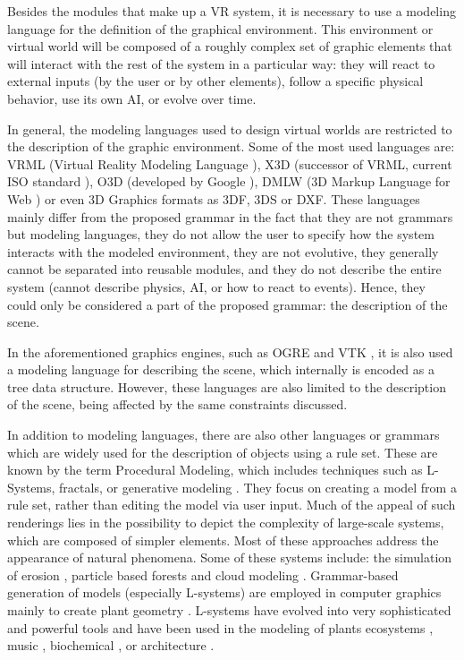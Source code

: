 Besides the modules that make up a VR system, it is necessary to use a modeling language for the
definition of the graphical environment. This environment or virtual world will be composed of a
roughly complex set of graphic elements that will interact with the rest of the system in a
particular way: they will react to external inputs (by the user or by other elements), follow a
specific physical behavior, use its own AI, or evolve over time.

In general, the modeling languages used to design virtual worlds \cite{Bartle2004} are restricted
to the description of the graphic environment. Some of the most used languages are: VRML (Virtual
Reality Modeling Language \cite{Web3D}), X3D (successor of VRML, current ISO standard
\cite{Web3D}), O3D (developed by Google \cite{O3D}), DMLW (3D Markup Language for Web \cite{DMLW})
or even 3D Graphics formats as 3DF, 3DS or DXF. These languages mainly differ from the proposed
grammar in the fact that they are not grammars but modeling languages, they do not allow the user
to specify how the system interacts with the modeled environment, they are not evolutive, they
generally cannot be separated into reusable modules, and they do not describe the entire system
(cannot describe physics, AI, or how to react to events). Hence, they could only be considered a
part of the proposed grammar: the description of the scene.

In the aforementioned graphics engines, such as OGRE \cite{OGRE} and VTK \cite{VTK}, it is also
used a modeling language for describing the scene, which internally is encoded as a tree data
structure. However, these languages are also limited to the description of the scene, being
affected by the same constraints discussed.

In addition to modeling languages, there are also other languages or grammars which are widely used
for the description of objects using a rule set. These are known by the term Procedural Modeling,
which includes techniques such as L-Systems, fractals, or generative modeling \cite{Yoav2001}. They
focus on creating a model from a rule set, rather than editing the model via user input. Much of
the appeal of such renderings lies in the possibility to depict the complexity of large-scale
systems, which are composed of simpler elements. Most of these approaches address the appearance of
natural phenomena. Some of these systems include: the simulation of erosion \cite{Musgrave1990},
particle based forests \cite{Reeves1985} and cloud modeling \cite{Perlin1985}. Grammar-based
generation of models (especially L-systems) are employed in computer graphics mainly to create
plant geometry \cite{Lindenmayer1990,Lindenmayer1992}. L-systems have evolved into very
sophisticated and powerful tools \cite{Prusinkiewicz2008,Palubicki2009} and have been used in the
modeling of plants ecosystems \cite{Prusinkiewicz2000}, music \cite{Manousakis2006}, biochemical
\cite{Spicher2008}, or architecture \cite{Yoav2001,Muller2006,Wang2008}.


